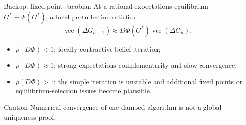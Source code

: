 \documentclass[10pt,aspectratio=169]{beamer}
\begin{document}
\begin{frame}{Backup: fixed-point Jacobian}
At a rational-expectations equilibrium $G^*=\Phi(G^*)$, a local perturbation
satisfies
\begin{equation*}
\operatorname{vec}(\Delta G_{n+1})
\approx D\Phi(G^*)\operatorname{vec}(\Delta G_n).
\end{equation*}
\begin{itemize}
  \item $\rho(D\Phi)<1$: locally contractive belief iteration;
  \item $\rho(D\Phi)\approx1$: strong expectations complementarity and slow
        convergence;
  \item $\rho(D\Phi)>1$: the simple iteration is unstable and additional fixed
        points or equilibrium-selection issues become plausible.
\end{itemize}
\begin{alertblock}{Caution}
Numerical convergence of one damped algorithm is not a global uniqueness proof.
\end{alertblock}
\end{frame}
\end{document}
